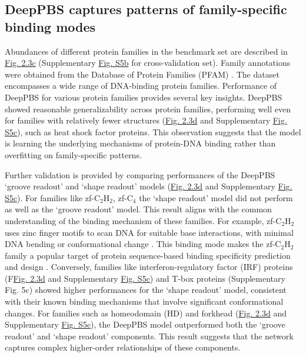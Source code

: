 \subsection{DeepPBS captures patterns of family-specific binding modes}
Abundances of different protein families in the benchmark set are described in \hyperref[fig:pdna2]{Fig. 2.3c} (Supplementary \hyperref[fig:pdnaS5]{Fig. S5b} for cross-validation set). Family annotations were obtained from the Database of Protein Families (PFAM) \citep{Mistry2021}. The dataset encompasses a wide range of DNA-binding protein families. Performance of DeepPBS for various protein families provides several key insights. DeepPBS showed reasonable generalizability across protein families, performing well even for families with relatively fewer structures (\hyperref[fig:pdna2]{Fig. 2.3d} and Supplementary \hyperref[fig:pdnaS5]{Fig. S5c}), such as heat shock factor proteins. This observation suggests that the model is learning the underlying mechanisms of protein-DNA binding rather than overfitting on family-specific patterns.
\par
Further validation is provided by comparing performances of the DeepPBS ‘groove readout’ and ‘shape readout’ models (\hyperref[fig:pdna2]{Fig. 2.3d} and Supplementary \hyperref[fig:pdnaS5]{Fig. S5c}). For families like zf-C$_2$H$_2$, zf-C$_4$ the ‘shape readout’ model did not perform as well as the ‘groove readout’ model. This result aligns with the common understanding of the binding mechanism of these families. For example, zf-C$_2$H$_2$ uses zinc finger motifs to scan DNA for suitable base interactions, with minimal DNA bending or conformational change \citep{Persikov2011}. This binding mode makes the zf-C$_2$H$_2$ family a popular target of protein sequence-based binding specificity prediction and design \citep{Persikov2014, persikov2009predicting, Sofia2022, Yanover2011, Ichikawa2023}. Conversely, families like interferon-regulatory factor (IRF) proteins (F\hyperref[fig:pdna2]{Fig. 2.3d} and Supplementary \hyperref[fig:pdnaS5]{Fig. S5c}) and T-box proteins (Supplementary Fig. 5c) showed higher performances for the ‘shape readout’ model, consistent with their known binding mechanisms that involve significant conformational changes\citep{Stirnimann2010, Escalante1998}. For families such as homeodomain (HD) and forkhead (\hyperref[fig:pdna2]{Fig. 2.3d} and Supplementary \hyperref[fig:pdnaS5]{Fig. S5c}), the DeepPBS model outperformed both the ‘groove readout’ and ‘shape readout’ components. This result suggests that the network captures complex higher-order relationships of these components. 

